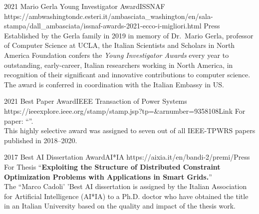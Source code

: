 \begin{awards}
	\awardentryD
	{2021}
	{Mario Gerla Young Investigator Award}{ISSNAF}
	{https://ambwashingtondc.esteri.it/ambasciata_washington/en/sala-stampa/dall_ambasciata/issnaf-awards-2021-ecco-i-migliori.html}
	{Press}
	{
	Established by the Gerla family in 2019 in memory of Dr.~Mario Gerla, professor of Computer Science at UCLA, the Italian Scientists and Scholars in North America Foundation confers the \emph{Young Investigator Awards} every year to outstanding, early-career, Italian researchers working in North America, in recognition of their significant and innovative contributions to computer science.
	The award is conferred in coordination with the Italian Embassy in US.
	}

	\awardentryD
	{2021}
	{Best Paper Award}{IEEE Transaction of Power Systems}
	{https://ieeexplore.ieee.org/stamp/stamp.jsp?tp=\&arnumber=9358108}{Link}
	{
	For paper: ``''.\\
	This highly selective award was assigned to seven out of all IEEE-TPWRS papers published in 2018--2020.}

	\awardentryD
	{2017}
	{Best AI Dissertation Award}{AI*IA} %
	{https://aixia.it/en/bandi-2/premi/}{Press}
	{For Thesis ``\textbf{Exploiting the Structure of Distributed Constraint Optimization Problems with Applications in Smart Grids.}''\\
	The ``Marco Cadoli' 'Best AI dissertation is assigned by the Italian 
	Association for Artificial Intelligence (AI*IA) to a Ph.D. doctor 
	who have obtained the title in an Italian University based on the 
	quality and impact of the thesis work.
	}
\end{awards}

\vspace{20pt}

